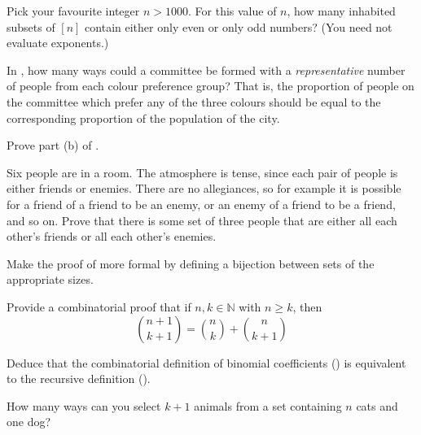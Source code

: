 \begin{exercise}
Pick your favourite integer $n > 1000$. For this value of $n$, how many inhabited subsets of $[n]$ contain either only even or only odd numbers? (You need not evaluate exponents.)
\end{exercise}


\begin{exercise}
\label{exCityColourModified}
In , how many ways could a committee be formed with a \textit{representative} number of people from each colour preference group? That is, the proportion of people on the committee which prefer any of the three colours should be equal to the corresponding proportion of the population of the city.
\end{exercise}


\begin{exercise}
Prove part (b) of .
\end{exercise}


\begin{exercise}
Six people are in a room. The atmosphere is tense, since each pair of people is either friends or enemies. There are no allegiances, so for example it is possible for a friend of a friend to be an enemy, or an enemy of a friend to be a friend, and so on. Prove that there is some set of three people that are either all each other's friends or all each other's enemies.
\end{exercise}


\begin{exercise}
Make the proof of  more formal by defining a bijection between sets of the appropriate sizes.
\end{exercise}

\begin{exercise}
\label{exPascalIdentity}
Provide a combinatorial proof that if $n,k \in \mathbb{N}$ with $n \ge k$, then
\[ \binom{n+1}{k+1} = \binom{n}{k} + \binom{n}{k+1} \]

Deduce that the combinatorial definition of binomial coefficients () is equivalent to the recursive definition ().
\begin{backhint}
How many ways can you select $k+1$ animals from a set containing $n$ cats and one dog?
\end{backhint}
\end{exercise}


